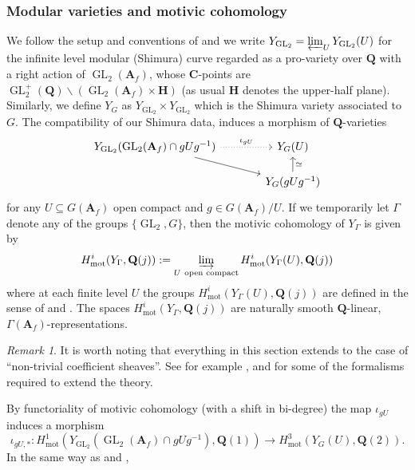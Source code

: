 \documentclass{amsart}%
\theoremstyle{plain}
\theoremstyle{plain}
\theoremstyle{remark}
\newtheorem{rem}[thm]{Remark}
\DeclareMathOperator{\GL}{GL}
\begin{document}
\subsubsection{Modular varieties and motivic cohomology}
We follow the setup and conventions of \cite{Loeffler_Skinner_Zerbes_2021} and we write $Y_{\GL_2}=\varprojlim_U Y_{\mathrm{GL}_2}(U)$ for the infinite level modular (Shimura) curve regarded as a pro-variety over $\mathbf{Q}$ with a right action of $\GL_2(\mathbf{A}_f)$, whose $\mathbf{C}$-points are $\GL_2^+(\mathbf{Q})\backslash (\GL_2(\mathbf{A}_f)\times \mathbf{H})$ (as usual $\mathbf{H}$ denotes the upper-half plane). Similarly, we define $Y_G$ as $Y_{\GL_2}\times Y_{\GL_2}$ which is the Shimura variety associated to $G$. The compatibility of our Shimura data, induces a morphism of $\mathbf{Q}$-varieties 
\[\begin{tikzcd}[sep=scriptsize]
	{Y_{\mathrm{GL}_2}(\mathrm{GL}_2(\mathbf{A}_f)\cap gUg^{-1})} && {Y_G(U)} \\
	&& {Y_G(gUg^{-1})}
	\arrow["{\iota_{gU}}", dotted, from=1-1, to=1-3]
	\arrow[from=1-1, to=2-3]
	\arrow["\simeq"', from=2-3, to=1-3]
\end{tikzcd}\]
for any $U\subseteq G(\mathbf{A}_f)$ open compact and $g\in G(\mathbf{A}_f)/U$. If we temporarily let $\Gamma$ denote any of the groups $\{\GL_2,G\}$, then the motivic cohomology of $Y_\Gamma$ is given by
$$H_\mathrm{mot}^i(Y_\Gamma,\mathbf{Q}(j)):=\varinjlim_{\substack{U\ \text{open compact}}} H_{\mathrm{mot}}^i(Y_\Gamma(U),\mathbf{Q}(j))$$
where at each finite level $U$ the groups $H_{\mathrm{mot}}^i(Y_\Gamma(U),\mathbf{Q}(j))$ are defined in the sense of \cite{voevodsky2000triangulated} and \cite{friedlander2000bivariant}. The spaces $H_\mathrm{mot}^i(Y_\Gamma,\mathbf{Q}(j))$ are naturally smooth $\mathbf{Q}$-linear, $\Gamma(\mathbf{A}_f)$-representations.
\begin{rem}
    It is worth noting that everything in this section extends to the case of ``non-trivial coefficient sheaves''. See for example \cite{Loeffler_2021}, \cite{Loeffler_Skinner_Zerbes_2021} and \cite{grossi2020norm} for some of the formalisms required to extend the theory.
\end{rem}
\noindent By functoriality of motivic cohomology (with a shift in bi-degree) the map $\iota_{gU}$ induces a morphism
$$\iota_{gU,*}:H_\mathrm{mot}^1(Y_{\GL_2}(\GL_2(\mathbf{A}_f)\cap gUg^{-1}),\mathbf{Q}(1))\longrightarrow H_\mathrm{mot}^3(Y_G(U),\mathbf{Q}(2)).$$
In the same way as \cite[\S $9.1$]{Loeffler_2021} and \cite[\S $8.2$]{Loeffler_Skinner_Zerbes_2021},
\end{document}
